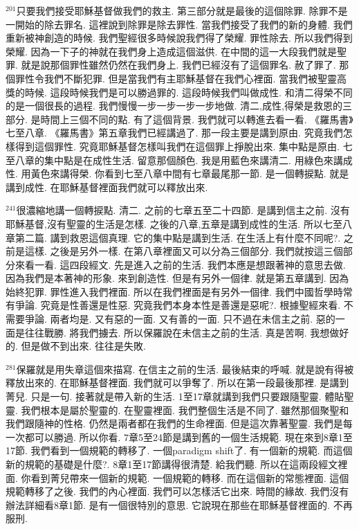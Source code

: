 \documentclass{book}
\begin{document}
$^{201}$只要我們接受耶穌基督做我們的救主.
第三部分就是最後的這個除罪.
除罪不是一開始的除去罪名.
這裡說到除罪是除去罪性.
當我們接受了我們的新的身體.
我們重新被神創造的時候.
我們聖經很多時候說我們得了榮耀.
罪性除去.
所以我們得到榮耀.
因為一下子的神就在我們身上造成這個滋供.
在中間的這一大段我們就是聖罪.
就是說那個罪性雖然仍然在我們身上.
我們已經沒有了這個罪名.
赦了罪了.
那個罪性令我們不斷犯罪.
但是當我們有主耶穌基督在我們心裡面.
當我們被聖靈高獎的時候.
這段時候我們是可以勝過罪的.
這段時候我們叫做成性.
和清二得榮不同的是一個很長的過程.
我們慢慢一步一步一步一步地做.
清二,成性,得榮是救恩的三部分.
是時間上三個不同的點.
有了這個背景.
我們就可以轉進去看一看.
《羅馬書》七至八章.
《羅馬書》第五章我們已經講過了.
那一段主要是講到原由.
究竟我們怎樣得到這個罪性.
究竟耶穌基督怎樣叫我們在這個罪上掙脫出來.
集中點是原由.
七至八章的集中點是在成性生活.
留意那個顏色.
我是用藍色來講清二.
用綠色來講成性.
用黃色來講得榮.
你看到七至八章中間有七章最尾那一節.
是一個轉捩點.
就是講到成性.
在耶穌基督裡面我們就可以釋放出來.

$^{241}$很濃縮地講一個轉捩點.
清二.
之前的七章五至二十四節.
是講到信主之前.
沒有耶穌基督,沒有聖靈的生活是怎樣.
之後的八章,五章是講到成性的生活.
所以七至八章第二篇.
講到救恩這個真理.
它的集中點是講到生活.
在生活上有什麼不同呢?.
之前是這樣.
之後是另外一樣.
在第八章裡面又可以分為三個部分.
我們就按這三個部分來看一看.
這四段經文.
先是進入之前的生活.
我們本應是想跟著神的意思去做.
因為我們是本著神的形象.
來到創造性.
但是有另外一個律.
就是第五章講到.
因為始終犯罪.
罪性進入我們裡面.
所以在我們裡面是有另外一個律.
我們中國哲學時常有爭論.
究竟是性善還是性惡.
究竟我們本身本性是善還是惡呢?.
根據聖經來看.
不需要爭論.
兩者均是.
又有惡的一面.
又有善的一面.
只不過在未信主之前.
惡的一面是往往戰勝.
將我們擄去.
所以保羅說在未信主之前的生活.
真是苦啊.
我想做好的.
但是做不到出來.
往往是失敗.

$^{281}$保羅就是用失章這個來描寫.
在信主之前的生活.
最後結束的呼喊.
就是說有得被釋放出來的.
在耶穌基督裡面.
我們就可以爭奪了.
所以在第一段最後那裡.
是講到菁兒.
只是一句.
接著就是帶入新的生活.
1至17章就講到我們只要跟隨聖靈.
體貼聖靈.
我們根本是屬於聖靈的.
在聖靈裡面.
我們整個生活是不同了.
雖然那個聚聖和我們跟隨神的性格.
仍然是兩者都在我們的生命裡面.
但是這次靠著聖靈.
我們是每一次都可以勝過.
所以你看.
7章5至24節是講到舊的一個生活規範.
現在來到8章1至17節.
我們看到一個規範的轉移了.
一個paradigm shift了.
有一個新的規範.
而這個新的規範的基礎是什麼?.
8章1至17節講得很清楚.
給我們聽.
所以在這兩段經文裡面.
你看到菁兒帶來一個新的規範.
一個規範的轉移.
而在這個新的常態裡面.
這個規範轉移了之後.
我們的內心裡面.
我們可以怎樣活它出來.
時間的緣故.
我們沒有辦法詳細看8章1節.
是有一個很特別的意思.
它說現在那些在耶穌基督裡面的.
不再服刑.
\end{document}
